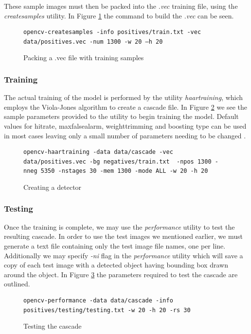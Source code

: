 These sample images must then be packed into the \emph{.vec} training file, using the  \emph{createsamples} utility. In Figure \ref{creating_samples} the command to build the \emph{.vec} can be seen.

\begin{figure}[h!]
\begin{lstlisting}
opencv-createsamples -info positives/train.txt -vec data/positives.vec -num 1300 -w 20 –h 20 
\end{lstlisting}
\caption{Packing a .vec file with training samples}
\label{creating_samples}
\end{figure}

\subsubsection{Training}
The actual training of the model is performed by the utility \emph{haartraining}, which employs the Viola-Jones algorithm to create a cascade file. In Figure \ref{creating_detector} we see the sample parameters provided to the utility to begin training the model. Default values for hitrate, maxfalsealarm, weighttrimming and boosting type can be used in most cases leaving only a small number of parameters needing to be changed \cite{adolf03}.

\begin{figure}[h!]
\begin{lstlisting}
opencv-haartraining -data data/cascade -vec data/positives.vec -bg negatives/train.txt  -npos 1300 -nneg 5350 -nstages 30 -mem 1300 -mode ALL -w 20 -h 20 
\end{lstlisting}
\caption{Creating a detector}
\label{creating_detector}
\end{figure}

\subsubsection{Testing}
Once the training is complete, we may use the \emph{performance} utility to test the resulting cascade. In order to use the test images we mentioned earlier, we must generate a text file containing only the test image file names, one per line. Additionally we may specify \emph{-ni} flag in the \emph{performance} utility which will save a copy of each test image with a detected object having bounding box drawn around the object. In Figure \ref{testing_cascade} the parameters required to test the cascade are outlined.

\begin{figure}[h!]
\begin{lstlisting}
opencv-performance -data data/cascade -info positives/testing/testing.txt -w 20 -h 20 -rs 30
\end{lstlisting}
\caption{Testing the cascade}
\label{testing_cascade}
\end{figure}

